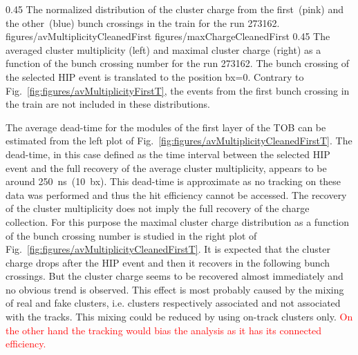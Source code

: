                  {0.45}       %
                 {The normalized distribution of the cluster charge from the first~(pink) and the other~(blue) bunch crossings in the train for the run 273162.} 
                 {figures/avMultiplicityCleanedFirst} %
                 {figures/maxChargeCleanedFirst} %
                 {0.45}       %
                 {The averaged cluster multiplicity (left) and maximal cluster charge (right) as a function of the bunch crossing number for the run 273162. The bunch crossing of the selected HIP event is translated to the position bx=0. Contrary to Fig.~\ref{fig:figures/avMultiplicityFirstT}, the events from the first bunch crossing in the train are not included in these distributions. } %

The average dead-time for the modules of the first layer of the TOB can be estimated from the left plot of Fig.~\ref{fig:figures/avMultiplicityCleanedFirstT}. The dead-time, in this case defined as the time interval between the selected HIP event and the full recovery of the average cluster multiplicity, appears to be around 250~ns~(10~bx). This dead-time is approximate as no tracking on these data was performed and thus the hit efficiency cannot be accessed. The recovery of the cluster multiplicity does not imply the full recovery of the charge collection. For this purpose the maximal cluster charge distribution as a function of the bunch crossing number is studied in the right plot of Fig.~\ref{fig:figures/avMultiplicityCleanedFirstT}. It is expected that the cluster charge drops after the HIP event and then it recovers in the following bunch crossings. But the cluster charge seems to be recovered almost immediately and no obvious trend is observed. This effect is most probably caused by the mixing of real and fake clusters, i.e. clusters respectively associated and not associated with the tracks. This mixing could be reduced by using on-track clusters only. \textcolor{red}{On the other hand the tracking would bias the analysis as it has its connected efficiency.}

